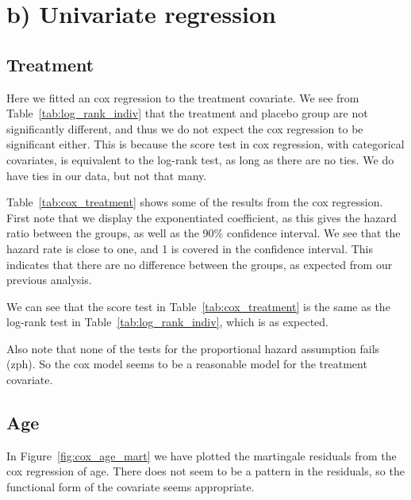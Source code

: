\documentclass[11pt,a4paper]{article}
\begin{document}
\section{b) Univariate regression}

\subsection{Treatment}

Here we fitted an cox regression to the treatment covariate. We see from Table~\ref{tab:log_rank_indiv} that the treatment and placebo group are not significantly different, and thus we do not expect the cox regression to be significant either. This is because the score test in cox regression, with categorical covariates, is equivalent to the log-rank test, as long as there are no ties. We do have ties in our data, but not that many.

Table~\ref{tab:cox_treatment} shows some of the results from the cox regression. First note that we display the exponentiated coefficient, as this gives the hazard ratio between the groups, as well as the 90\% confidence interval. We see that the hazard rate is close to one, and 1 is covered in the confidence interval. This indicates that there are no difference between the groups, as expected from our previous analysis.

We can see that the score test in Table~\ref{tab:cox_treatment} is the same as the log-rank test in Table~\ref{tab:log_rank_indiv}, which is as expected.

Also note that none of the tests for the proportional hazard assumption fails (zph).
So the cox model seems to be a reasonable model for the treatment covariate.




\subsection{Age}



In Figure~\ref{fig:cox_age_mart} we have plotted the martingale residuals from the cox regression of age. There does not seem to be a pattern in the residuals, so the functional form of the covariate seems appropriate.
\end{document}

